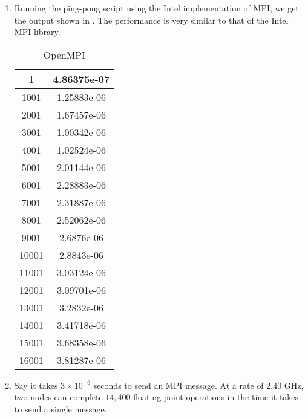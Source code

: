 \documentclass{hw}
\begin{document}
\begin{enumerate}
\begin{enumerate}
      \item
        Running the ping-pong script using the Intel implementation of MPI, we
        get the output shown in . The performance is very
        similar to that of the Intel MPI library.

        \begin{table}[h]
          \centering
          \begin{tabular}{|c|c|}
            \hline
            1     & 4.86375e-07 \\\hline
            1001  & 1.25883e-06 \\\hline
            2001  & 1.67457e-06 \\\hline
            3001  & 1.00342e-06 \\\hline
            4001  & 1.02524e-06 \\\hline
            5001  & 2.01144e-06 \\\hline
            6001  & 2.28883e-06 \\\hline
            7001  & 2.31887e-06 \\\hline
            8001  & 2.52062e-06 \\\hline
            9001  & 2.6876e-06 \\\hline
            10001 & 2.8843e-06 \\\hline
            11001 & 3.03124e-06 \\\hline
            12001 & 3.09701e-06 \\\hline
            13001 & 3.2832e-06 \\\hline
            14001 & 3.41718e-06 \\\hline
            15001 & 3.68358e-06 \\\hline
            16001 & 3.81287e-06 \\\hline
          \end{tabular}
          \caption{OpenMPI}
          \label{tab:openmpi}
        \end{table}

      \item
        Say it takes $3 \times 10^{-6}$ seconds to send an MPI message. At
        a rate of 2.40 GHz, two nodes can complete $14,400$ floating point
        operations in the time it takes to send a single message.
    \end{enumerate}
\end{enumerate}
\end{document}
